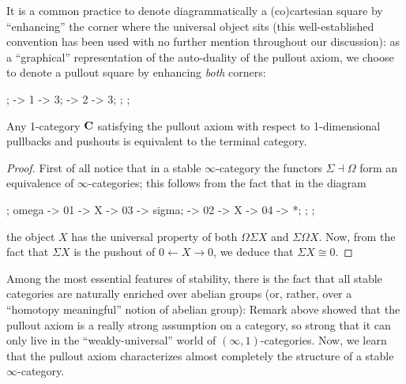 \begin{notat}
It is a common practice to denote diagrammatically a (co)cartesian square by ``enhancing'' the corner where the universal object sits (this well\hyp{}established convention has been used with no further mention throughout our discussion): as a ``graphical'' representation of the auto\hyp{}duality of the pullout axiom, we choose to denote a pullout square by enhancing \emph{both} corners: 
\begin{center}
\begin{kD}
;
 -> 1 -> 3;
 -> 2 -> 3;
;
;
\end{kD}
\end{center}
\end{notat}
\begin{remark}\label{pullout.is.genuinely.higher}
Any 1\hyp{}category $\mathbf{C}$ satisfying the pullout axiom with respect to 1-dimensional pullbacks and pushouts is equivalent to the terminal category.
\end{remark}
\begin{proof}
First of all notice that in a stable $\infty$\hyp{}category the functors $\Sigma\dashv \Omega$ form an equivalence of $\infty$\hyp{}categories; this follows from the fact that in the diagram
\begin{center}
\begin{kD}
;
\mor omega -> 01 -> X -> 03 -> sigma;
\mor * -> 02 -> X -> 04 -> *;
;
;
\end{kD}
\end{center}
the object $X$ has the universal property of both $\Omega\Sigma X$ and $\Sigma\Omega X$. Now, from the fact that $\Sigma X$ is the pushout of $0\leftarrow X\to 0$, we deduce that $\Sigma X\cong 0$.
\end{proof}
Among the most essential features of stability, there is the fact that all stable categories are naturally enriched over abelian groups (or, rather, over a ``homotopy meaningful'' notion of abelian group): Remark  above showed that the pullout axiom is a really strong assumption on a category, so strong that it can only live in the ``weakly\hyp{}universal'' world of $(\infty,1)$\hyp{}categories. Now, we learn that the pullout axiom characterizes almost completely the structure of a stable $\infty$\hyp{}category. 
